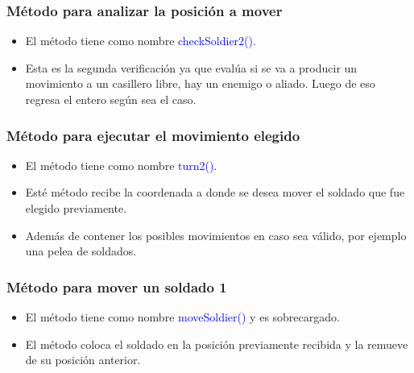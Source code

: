 \documentclass{article}
\begin{document}
\subsubsection{Método para analizar la posición a mover}
\begin{itemize}
    \item El método tiene como nombre \textcolor{blue}{checkSoldier2()}.
    \item Esta es la segunda verificación ya que evalúa si se va a producir un movimiento a un casillero libre, hay un enemigo o aliado. Luego de eso regresa el entero según sea el caso.
\end{itemize}


\newpage

\subsubsection{Método para ejecutar el movimiento elegido}
\begin{itemize}
    \item El método tiene como nombre \textcolor{blue}{turn2()}.
    \item Esté método recibe la coordenada a donde se desea mover el soldado que fue elegido previamente.
    \item Además de contener los posibles movimientos en caso sea válido, por ejemplo una pelea de soldados.
\end{itemize}



\subsubsection{Método para mover un soldado 1}
\begin{itemize}
    \item El método tiene como nombre \textcolor{blue}{moveSoldier()} y es sobrecargado.
    \item El método coloca el soldado en la posición previamente recibida y la remueve de su posición anterior.
\end{itemize}

\end{document}
